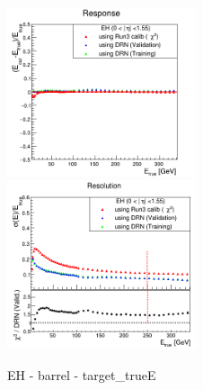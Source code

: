 \begin{figure}
\includegraphics[width=0.495\textwidth]{./HCAL_plots/Trained_target_ratioflip_0_500_10/pdf/EH_barrel/barrel_corrEtaBarrelEcalHcal.png}
\includegraphics[width=0.495\textwidth]{./HCAL_plots/Trained_target_ratioflip_0_500_10/pdf/EH_barrel/barrel_corrEtaBarrelEcalHcal_reso.png}
\caption{EH - barrel - target_trueE}                                                                                                                                               
\end{figure}                                                                                                                                                                      

